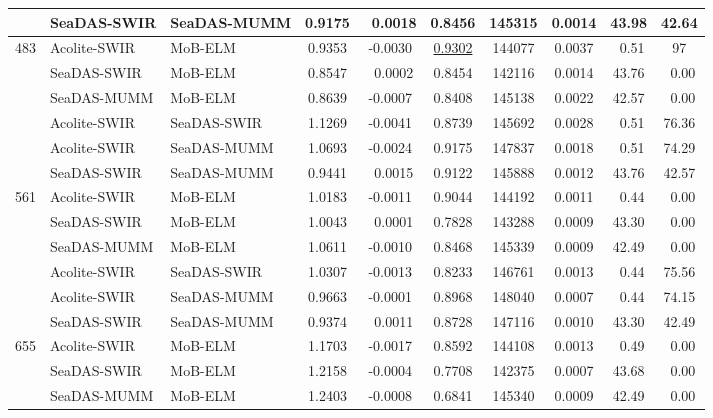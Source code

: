 \begin{landscape}
\begin{table}[htb!]
\begin{tabular}{cllccccccc}
      &   SeaDAS-SWIR   &  SeaDAS-MUMM  & 0.9175  & ~0.0018 & 0.8456  & 145315  & 0.0014  &  43.98      & 42.64             \\  \hline
\multirow{6}{*}{483}&Acolite-SWIR&MoB-ELM     & 0.9353  & -0.0030 & \underline{0.9302}  & 144077  & 0.0037  &  ~0.51               &   97      \\
      &   SeaDAS-SWIR   &  MoB-ELM      & 0.8547  & ~0.0002 & 0.8454  & 142116  & 0.0014  &  43.76      & ~0.00             \\
      &   SeaDAS-MUMM   &  MoB-ELM      & 0.8639  & -0.0007 & 0.8408  & 145138  & 0.0022  &  42.57      & ~0.00             \\ 
      &   Acolite-SWIR  &  SeaDAS-SWIR  & 1.1269  & -0.0041 & 0.8739  & 145692  & 0.0028  &  ~0.51      & 76.36             \\
      &   Acolite-SWIR  &  SeaDAS-MUMM  & 1.0693  & -0.0024 & 0.9175  & 147837  & 0.0018  &  ~0.51      & 74.29             \\
      &   SeaDAS-SWIR   &  SeaDAS-MUMM  & 0.9441  & ~0.0015 & 0.9122  & 145888  & 0.0012  &  43.76      & 42.57             \\ \hline
\multirow{6}{*}{561}&Acolite-SWIR&  MoB-ELM   & 1.0183  & -0.0011 & 0.9044  & 144192  & 0.0011  &  ~0.44      & ~0.00       \\
      &   SeaDAS-SWIR   &  MoB-ELM      & 1.0043  & ~0.0001 & 0.7828  & 143288  & 0.0009  &  43.30      & ~0.00             \\
      &   SeaDAS-MUMM   &  MoB-ELM      & 1.0611  & -0.0010 & 0.8468  & 145339  & 0.0009  &  42.49      & ~0.00             \\
      &   Acolite-SWIR  &  SeaDAS-SWIR  & 1.0307  & -0.0013 & 0.8233  & 146761  & 0.0013  &  ~0.44      & 75.56             \\
      &   Acolite-SWIR  &  SeaDAS-MUMM  & 0.9663  & -0.0001 & 0.8968  & 148040  & 0.0007  &  ~0.44      & 74.15             \\
        &   SeaDAS-SWIR   &  SeaDAS-MUMM  & 0.9374  & ~0.0011 & 0.8728  & 147116  & 0.0010  &  43.30      & 42.49           \\ \hline
\multirow{6}{*}{655}&Acolite-SWIR&MoB-ELM     & 1.1703  & -0.0017 & 0.8592  & 144108  & 0.0013  &  ~0.49      & ~0.00       \\
      &   SeaDAS-SWIR   &  MoB-ELM      & 1.2158  & -0.0004 & 0.7708  & 142375  & 0.0007  &  43.68      & ~0.00             \\
      &   SeaDAS-MUMM   &  MoB-ELM      & 1.2403  & -0.0008 & 0.6841  & 145340  & 0.0009  &  42.49      & ~0.00             \\ 

\end{tabular}
\end{table}
\end{landscape}
